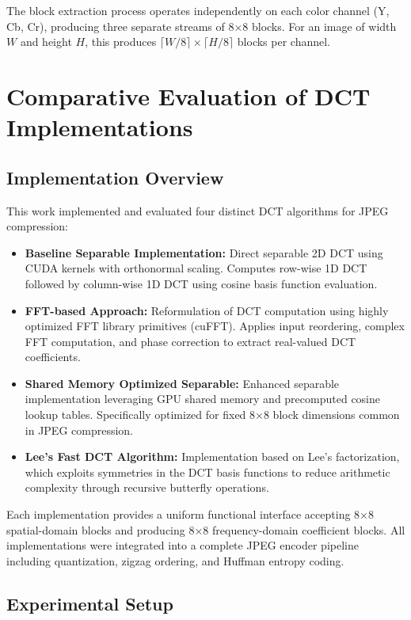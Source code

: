 \documentclass{article}
\begin{document}
The block extraction process operates independently on each color channel (Y, Cb, Cr), producing three separate streams of 8×8 blocks. For an image of width $W$ and height $H$, this produces $\lceil W/8 \rceil \times \lceil H/8 \rceil$ blocks per channel.

\section{Comparative Evaluation of DCT Implementations}

\subsection{Implementation Overview}

This work implemented and evaluated four distinct DCT algorithms for JPEG compression:

\begin{itemize}
\item \textbf{Baseline Separable Implementation:} Direct separable 2D DCT using CUDA kernels with orthonormal scaling. Computes row-wise 1D DCT followed by column-wise 1D DCT using cosine basis function evaluation.

\item \textbf{FFT-based Approach:} Reformulation of DCT computation using highly optimized FFT library primitives (cuFFT). Applies input reordering, complex FFT computation, and phase correction to extract real-valued DCT coefficients.

\item \textbf{Shared Memory Optimized Separable:} Enhanced separable implementation leveraging GPU shared memory and precomputed cosine lookup tables. Specifically optimized for fixed 8×8 block dimensions common in JPEG compression.

\item \textbf{Lee's Fast DCT Algorithm:} Implementation based on Lee's factorization, which exploits symmetries in the DCT basis functions to reduce arithmetic complexity through recursive butterfly operations.
\end{itemize}

Each implementation provides a uniform functional interface accepting 8×8 spatial-domain blocks and producing 8×8 frequency-domain coefficient blocks. All implementations were integrated into a complete JPEG encoder pipeline including quantization, zigzag ordering, and Huffman entropy coding.

\subsection{Experimental Setup}
\end{document}
